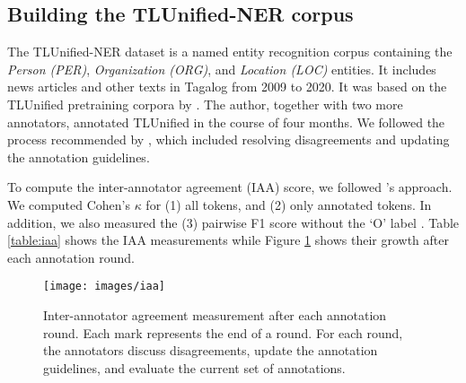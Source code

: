 \documentclass[11pt]{article}
\begin{document}
\subsection{Building the TLUnified-NER corpus}



The TLUnified-NER dataset is a named entity recognition corpus containing the \textit{Person (PER)}, \textit{Organization (ORG)}, and \textit{Location  (LOC)} entities.
It includes news articles and other texts in Tagalog from 2009 to 2020.
It was based on the TLUnified pretraining corpora by \cite{Cruz2021ImprovingLL}.
The author, together with two more annotators, annotated TLUnified in the course of four months.
We followed the process recommended by \citet{Reiter2017HT}, which included resolving disagreements and updating the annotation guidelines.

To compute the inter-annotator agreement (IAA) score, we followed \citet{Brandsen2020CreatingAD}'s approach.
We computed Cohen's $\kappa$ for (1) all tokens, and (2) only annotated tokens.  
In addition, we also measured the (3) pairwise F1 score without the `O' label \citep{Deleger2012BG}.
Table \ref{table:iaa} shows the IAA measurements while Figure \ref{fig:iaa} shows their growth after each annotation round.

\begin{figure}[t]
\centering
\texttt{[image: images/iaa]}
\caption{
  Inter-annotator agreement measurement after each annotation round.
  Each mark represents the end of a round. 
  For each round, the annotators discuss disagreements, update the annotation guidelines, and evaluate the current set of annotations.
}
\label{fig:iaa}
\end{figure}
\end{document}
